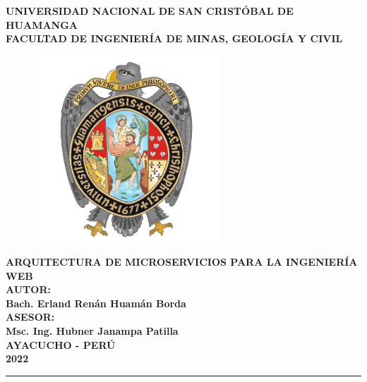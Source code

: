 \begin{singlespace}
\begin{titlepage}

\centering
  { \fontsize{18pt}{\baselineskip}\selectfont \textbf{UNIVERSIDAD NACIONAL DE SAN CRISTÓBAL DE HUAMANGA} }\\[0.25cm]
  { \fontsize{16pt}{\baselineskip}\selectfont \textbf{FACULTAD DE INGENIERÍA DE MINAS, GEOLOGÍA Y CIVIL} }\\[0.55cm]

  \begin{figure}[htb]
    \centering
    \includegraphics[height=7cm]{src/assets/unsch_logo.jpg}
  \end{figure}

\vspace{0.5cm}
{\fontsize{14pt}{ \baselineskip}\selectfont \textbf{
  ARQUITECTURA DE MICROSERVICIOS PARA LA INGENIERÍA WEB
}}\\[0.5cm]
{\fontsize{14pt}{ \baselineskip}\selectfont \textbf{AUTOR:}}\\[0.5cm]
{\fontsize{14pt}{ \baselineskip}\selectfont \textbf{Bach. Erland Renán Huamán Borda}}\\[0.5cm]
{\fontsize{14pt}{ \baselineskip}\selectfont \textbf{ASESOR:}}\\[0.5cm]
{\fontsize{14pt}{ \baselineskip}\selectfont \textbf{Msc. Ing. Hubner Janampa Patilla}}\\[0.5cm]

\vfill
{\fontsize{14pt}{ \baselineskip}\selectfont \textbf{AYACUCHO - PERÚ}}\\[0.5cm]
{\fontsize{14pt}{ \baselineskip}\selectfont \textbf{2022}}
\singlespacing
\rule{132mm}{0.25mm}\\

\end{titlepage}
\end{singlespace}
\restoregeometry
